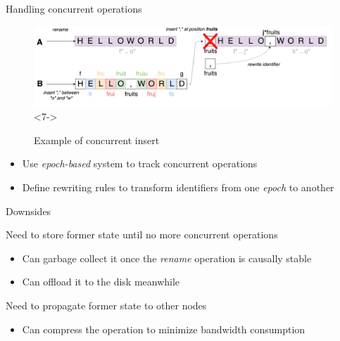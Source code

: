 \documentclass[10pt]{beamer}
\begin{document}
\begin{frame}{Handling concurrent operations}
\begin{figure}
    \includegraphics[scale=0.08]{img/concurrent-insert-rename-6.png}<7->
    \caption{Example of concurrent insert}
  \end{figure}
  \begin{itemize}
    \item<5-> Use \emph{epoch-based} system to track concurrent operations
    \item<6-> Define rewriting rules to transform identifiers from one \emph{epoch} to another
  \end{itemize}
\end{frame}

\begin{frame}{Downsides}
  \begin{block}{Need to store former state until no more concurrent operations}

    \pause

    \begin{itemize}
      \item Can garbage collect it once the \emph{rename} operation is causally stable 
      \item Can offload it to the disk meanwhile
    \end{itemize}
  \end{block}

  \pause

  \begin{block}{Need to propagate former state to other nodes}

    \pause

    \begin{itemize}
      \item Can compress the operation to minimize bandwidth consumption
    \end{itemize}
  \end{block}
\end{frame}

\end{document}
